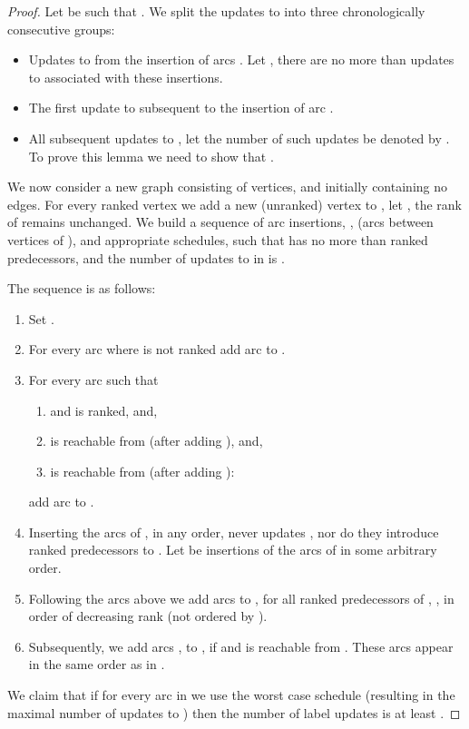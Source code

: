 \documentclass[11pt]{article}
\theoremstyle{plain}
\theoremstyle{definition}
\theoremstyle{remark}
\numberwithin{equation}{section}
\begin{document}
\begin{proof}
  Let  be such that .
  We split the updates to  into three chronologically consecutive groups:
  \begin{itemize}
    \item Updates to  from the insertion of arcs . Let , there are no more than  updates to  associated with these insertions.
    \item The first update to  subsequent to the insertion of arc .
    \item \label{split:hard} All subsequent updates to , let the number of such updates be denoted by . To prove this lemma we need to show that
    .
  \end{itemize}

  We now consider a new graph consisting of  vertices, and initially containing no edges.
  For every ranked vertex  we add a new (unranked) vertex  to , let , the rank of  remains unchanged.
   We build a sequence of arc insertions, , (arcs between vertices of ), and appropriate schedules, such that  has no more than
    ranked predecessors, and the number of updates to  in  is .

   The sequence  is as follows:
   \begin{enumerate}
   \item Set .
   \item For every arc  where  is not ranked add arc  to .
   \item For every arc  such that \begin{enumerate} \item   and  is ranked, and, \item   is reachable from  (after adding ), and, \item  is reachable from  (after adding ):
   \end{enumerate}  add arc  to .
   \item Inserting the arcs of , in any order, never updates , nor do they introduce ranked predecessors to . Let  be insertions of the arcs of  in some arbitrary order.
   \item \label{tau:ui} Following the arcs above we add arcs  to , for all ranked predecessors of , , in order of decreasing rank (not ordered by ).
   \item Subsequently, we add arcs ,  to , if  and  is reachable from . These arcs appear in the same order as in .
   \end{enumerate}

We claim that if for every arc in  we use the worst case
schedule (resulting in the maximal number of updates to )
then the number of label updates is at least .


\end{proof}
\end{document}
